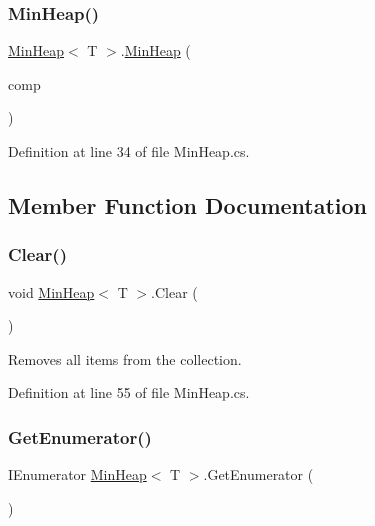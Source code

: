 \subsubsection{\texorpdfstring{Min\+Heap()}{MinHeap()}\hspace{0.1cm}{\footnotesize\ttfamily [2/2]}}
{\footnotesize\ttfamily \hyperlink{class_min_heap}{Min\+Heap}$<$ T $>$.\hyperlink{class_min_heap}{Min\+Heap} (\begin{DoxyParamCaption}\item[{I\+Comparer$<$ T $>$}]{comp }\end{DoxyParamCaption})}



Definition at line 34 of file Min\+Heap.\+cs.



\subsection{Member Function Documentation}
\mbox{\label{class_min_heap_a3d6a33a214d775e6973f2e02f95cf993}} 
\subsubsection{\texorpdfstring{Clear()}{Clear()}}
{\footnotesize\ttfamily void \hyperlink{class_min_heap}{Min\+Heap}$<$ T $>$.Clear (\begin{DoxyParamCaption}{ }\end{DoxyParamCaption})}



Removes all items from the collection. 



Definition at line 55 of file Min\+Heap.\+cs.

\mbox{\label{class_min_heap_a37ff412300c1e588a2aeac794ba9a5a4}} 
\subsubsection{\texorpdfstring{Get\+Enumerator()}{GetEnumerator()}}
{\footnotesize\ttfamily I\+Enumerator \hyperlink{class_min_heap}{Min\+Heap}$<$ T $>$.Get\+Enumerator (\begin{DoxyParamCaption}{ }\end{DoxyParamCaption})}



